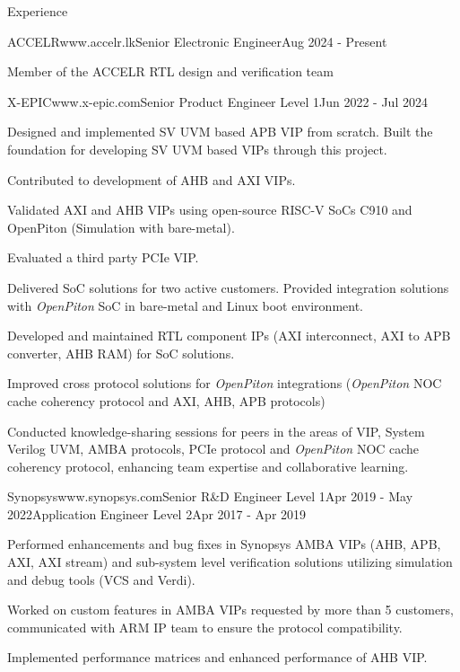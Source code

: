 \documentclass[
11pt, %
]{./assets/resume} %
\begin{document}
\begin{rSection}{Experience}
	\begin{rSubsectionX}{ACCELR}{www.accelr.lk}{Senior Electronic Engineer}{Aug 2024 - Present}
		\item Member of the ACCELR RTL design and verification team
	\end{rSubsectionX}
	\begin{rSubsectionX}{X-EPIC}{www.x-epic.com}{Senior Product Engineer Level 1}{Jun 2022 - Jul 2024}
		\item Designed and implemented SV UVM based APB VIP from scratch. Built the foundation for developing SV UVM based VIPs through this project.
		\item Contributed to development of AHB and AXI VIPs.
		\item Validated AXI and AHB VIPs using open-source RISC-V SoCs C910 and OpenPiton (Simulation with bare-metal).
		\item Evaluated a third party PCIe VIP.
		\item Delivered SoC solutions for two active customers. Provided integration solutions with \textit{OpenPiton} SoC in bare-metal and Linux boot environment.
		\item Developed and maintained RTL component IPs (AXI interconnect, AXI to APB converter, AHB RAM) for SoC solutions.
		\item Improved cross protocol solutions for \textit{OpenPiton} integrations (\textit{OpenPiton} NOC cache coherency protocol and AXI, AHB, APB protocols)
		\item Conducted knowledge-sharing sessions for peers in the areas of VIP, System Verilog UVM, AMBA protocols, PCIe protocol and \textit{OpenPiton} NOC cache coherency protocol, enhancing team expertise and collaborative learning.
	\end{rSubsectionX}
	\begin{rSubsectionM}{Synopsys}{www.synopsys.com}{Senior R\&D Engineer Level 1}{Apr 2019 - May 2022}{Application Engineer Level 2}{Apr 2017 - Apr 2019}{}{}
		\item Performed enhancements and bug fixes in Synopsys AMBA VIPs (AHB, APB, AXI, AXI stream) and sub-system level verification solutions utilizing simulation and debug tools (VCS and Verdi).
		\item Worked on custom features in AMBA VIPs requested by more than 5 customers, communicated with ARM IP team to ensure the protocol compatibility.
		\item Implemented performance matrices and enhanced performance of AHB VIP.

\end{rSubsectionM}
\end{rSection}
\end{document}
